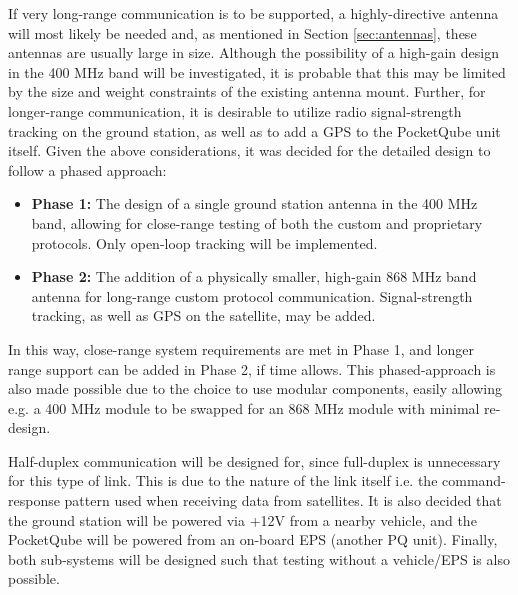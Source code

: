 If very long-range communication is to be supported, a highly-directive antenna will most likely be needed and, as mentioned in Section \ref{sec:antennas}, these antennas are usually large in size. Although the possibility of a high-gain design in the 400 MHz band will be investigated, it is probable that this may be limited by the size and weight constraints of the existing antenna mount. Further, for longer-range communication, it is desirable to utilize radio signal-strength tracking on the ground station, as well as to add a GPS to the PocketQube unit itself. Given the above considerations, it was decided for the detailed design to follow a phased approach:
\begin{itemize}
  \item \textbf{Phase 1:} The design of a single ground station antenna in the 400 MHz band, allowing for close-range testing of both the custom and proprietary protocols. Only open-loop tracking will be implemented.
  \item \textbf{Phase 2:} The addition of a physically smaller, high-gain 868 MHz band antenna for long-range custom protocol communication. Signal-strength tracking, as well as GPS on the satellite, may be added.
\end{itemize}

\noindent In this way, close-range system requirements are met in Phase 1, and longer range support can be added in Phase 2, if time allows. This phased-approach is also made possible due to the choice to use modular components, easily allowing e.g. a 400 MHz module to be swapped for an 868 MHz module with minimal re-design.

Half-duplex communication will be designed for, since full-duplex is unnecessary for this type of link. This is due to the nature of the link itself i.e. the command-response pattern used when receiving data from satellites. It is also decided that the ground station will be powered via +12V from a nearby vehicle, and the PocketQube will be powered from an on-board EPS (another PQ unit). Finally, both sub-systems will be designed such that testing without a vehicle/EPS is also possible.